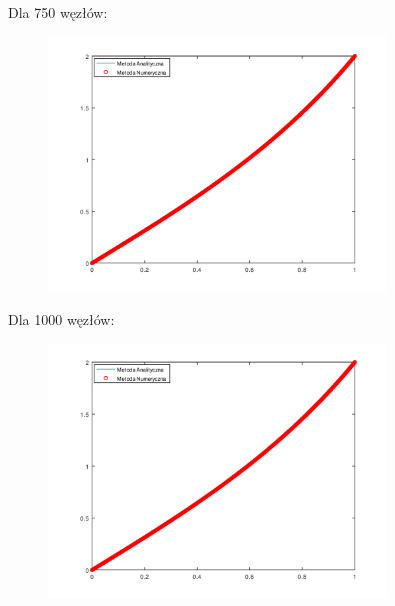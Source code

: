 \newpage
\begin{samepage}
Dla 750 węzłów:

\begin{figure}[!ht]
    \begin{center}
    \includegraphics[width=0.8\textwidth]{Lab4/charts/zad1/zad1_n_750.png}
    \end{center}
\end{figure}
\FloatBarrier
\end{samepage}
    

\begin{samepage}
Dla 1000 węzłów:

\begin{figure}[!ht]
    \begin{center}
    \includegraphics[width=0.8\textwidth]{Lab4/charts/zad1/zad1_n_1000.png}
    \end{center}
\end{figure}
\FloatBarrier
\end{samepage}    

